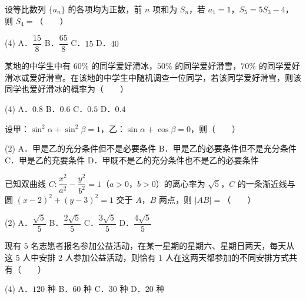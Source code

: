 \begin{question}
设等比数列 $\{a_n\}$ 的各项均为正数，前 $n$ 项和为 $S_n$，若 $a_1=1$，$S_5=5S_3-4$，则 $S_4=$\mbox{（　　）}

\begin{gkopts}(4)
\task A．$\dfrac{15}{8}$
\task B．$\dfrac{65}{8}$
\task C．$15$
\task D．$40$
\end{gkopts}

\end{question}
\begin{question}
某地的中学生中有 $60\%$ 的同学爱好滑冰，$50\%$ 的同学爱好滑雪，$70\%$ 的同学爱好滑冰或爱好滑雪。在该地的中学生中随机调查一位同学，若该同学爱好滑雪，则该同学也爱好滑冰的概率为\mbox{（　　）}

\begin{gkopts}(4)
\task A．$0.8$
\task B．$0.6$
\task C．$0.5$
\task D．$0.4$
\end{gkopts}

\end{question}
\begin{question}
设甲：$\sin^2\alpha+\sin^2\beta=1$，乙：$\sin\alpha+\cos\beta=0$，则\mbox{（　　）}

\begin{gkopts}(2)
\task A．甲是乙的充分条件但不是必要条件
\task B．甲是乙的必要条件但不是充分条件
\task C．甲是乙的充要条件
\task D．甲既不是乙的充分条件也不是乙的必要条件
\end{gkopts}

\end{question}
\begin{question}
已知双曲线 $C:\dfrac{x^2}{a^2}-\dfrac{y^2}{b^2}=1$（$a>0$，$b>0$）的离心率为 $\sqrt5$，$C$ 的一条渐近线与圆 $(x-2)^2+(y-3)^2=1$ 交于 $A$，$B$ 两点，则 $|AB|=$\mbox{（　　）}

\begin{gkopts}(2)
\task A．$\dfrac{\sqrt5}{5}$
\task B．$\dfrac{2\sqrt5}{5}$
\task C．$\dfrac{3\sqrt5}{5}$
\task D．$\dfrac{4\sqrt5}{5}$
\end{gkopts}

\end{question}
\begin{question}
现有 $5$ 名志愿者报名参加公益活动，在某一星期的星期六、星期日两天，每天从这 $5$ 人中安排 $2$ 人参加公益活动，则恰有 $1$ 人在这两天都参加的不同安排方式共有\mbox{（　　）}

\begin{gkopts}(4)
\task A．$120$ 种
\task B．$60$ 种
\task C．$30$ 种
\task D．$20$ 种
\end{gkopts}

\end{question}
